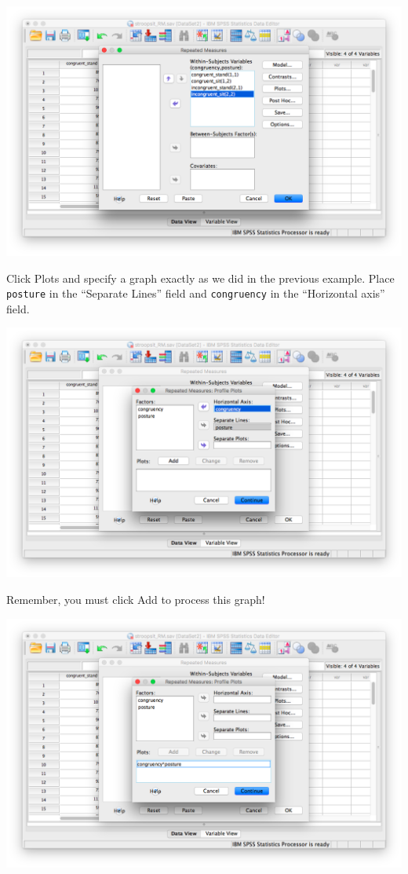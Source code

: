 \documentclass[
]{book}
\begin{document}
\includegraphics{img/10.4.27.png}

Click {Plots} and specify a graph exactly as we did in the previous example. Place \texttt{posture} in the ``Separate Lines'' field and \texttt{congruency} in the ``Horizontal axis'' field.

\includegraphics{img/10.4.28.png}

Remember, you must click {Add} to process this graph!

\includegraphics{img/10.4.29.png}
\end{document}
